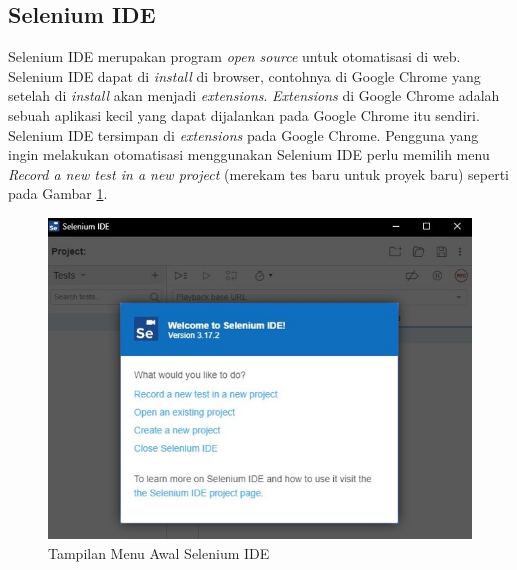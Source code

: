 \subsection{Selenium IDE}
\label{sec:seleniumIDE}  
Selenium IDE merupakan program \textit{open source} untuk otomatisasi di web. Selenium IDE dapat di \textit{install} di browser, contohnya di Google Chrome yang setelah di \textit{install} akan menjadi \textit{extensions}. \textit{Extensions} di Google Chrome adalah sebuah aplikasi kecil yang dapat dijalankan pada Google Chrome itu sendiri. Selenium IDE tersimpan di \textit{extensions} pada Google Chrome. Pengguna yang ingin melakukan otomatisasi menggunakan Selenium IDE perlu memilih menu \textit{Record a new test in a new project} (merekam tes baru untuk proyek baru) seperti pada Gambar \ref{fig:menuSeleniumIDE}.
\begin{figure}[H]
	\centering
	\includegraphics[scale=0.5]{Gambar/menuSeleniumIDE.jpg}
	\caption{Tampilan Menu Awal Selenium IDE} 
	\label{fig:menuSeleniumIDE}
\end{figure}

